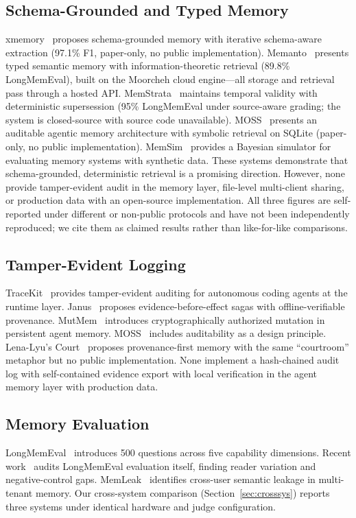 \documentclass[11pt]{article}
\begin{document}
\subsection{Schema-Grounded and Typed Memory}
xmemory~\citep{xmemory} proposes schema-grounded memory with iterative schema-aware extraction (97.1\% F1, paper-only, no public implementation). Memanto~\citep{memanto} presents typed semantic memory with information-theoretic retrieval (89.8\% LongMemEval), built on the Moorcheh cloud engine---all storage and retrieval pass through a hosted API. MemStrata~\citep{memstrata} maintains temporal validity with deterministic supersession (95\% LongMemEval under source-aware grading; the system is closed-source with source code unavailable). MOSS~\citep{moss} presents an auditable agentic memory architecture with symbolic retrieval on SQLite (paper-only, no public implementation). MemSim~\citep{memsim} provides a Bayesian simulator for evaluating memory systems with synthetic data. These systems demonstrate that schema-grounded, deterministic retrieval is a promising direction. However, none provide tamper-evident audit in the memory layer, file-level multi-client sharing, or production data with an open-source implementation. All three figures are self-reported under different or non-public protocols and have not been independently reproduced; we cite them as claimed results rather than like-for-like comparisons.

\subsection{Tamper-Evident Logging}
TraceKit~\citep{tracekit} provides tamper-evident auditing for autonomous coding agents at the runtime layer. Janus~\citep{janus} proposes evidence-before-effect sagas with offline-verifiable provenance. MutMem~\citep{mutmem} introduces cryptographically authorized mutation in persistent agent memory. MOSS~\citep{moss} includes auditability as a design principle. Lena-Lyu's Court~\citep{court} proposes provenance-first memory with the same ``courtroom'' metaphor but no public implementation. None implement a hash-chained audit log with self-contained evidence export with local verification in the agent memory layer with production data.

\subsection{Memory Evaluation}
LongMemEval~\citep{wu2024longmemeval} introduces 500 questions across five capability dimensions. Recent work~\citep{auditlme} audits LongMemEval evaluation itself, finding reader variation and negative-control gaps. MemLeak~\citep{memleak} identifies cross-user semantic leakage in multi-tenant memory. Our cross-system comparison (Section~\ref{sec:crosssys}) reports three systems under identical hardware and judge configuration.
\end{document}
